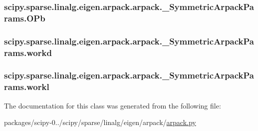 \subsubsection[{O\+Pb}]{\setlength{\rightskip}{0pt plus 5cm}scipy.\+sparse.\+linalg.\+eigen.\+arpack.\+arpack.\+\_\+\+Symmetric\+Arpack\+Params.\+O\+Pb}\label{classscipy_1_1sparse_1_1linalg_1_1eigen_1_1arpack_1_1arpack_1_1__SymmetricArpackParams_a47d02a66df63c498ea8040750c61daf0}
\hypertarget{classscipy_1_1sparse_1_1linalg_1_1eigen_1_1arpack_1_1arpack_1_1__SymmetricArpackParams_a29d44490cde9800363f511a399f6e00f}{}
\subsubsection[{workd}]{\setlength{\rightskip}{0pt plus 5cm}scipy.\+sparse.\+linalg.\+eigen.\+arpack.\+arpack.\+\_\+\+Symmetric\+Arpack\+Params.\+workd}\label{classscipy_1_1sparse_1_1linalg_1_1eigen_1_1arpack_1_1arpack_1_1__SymmetricArpackParams_a29d44490cde9800363f511a399f6e00f}
\hypertarget{classscipy_1_1sparse_1_1linalg_1_1eigen_1_1arpack_1_1arpack_1_1__SymmetricArpackParams_add676a07c109aaa21ed43b0e59a62830}{}
\subsubsection[{workl}]{\setlength{\rightskip}{0pt plus 5cm}scipy.\+sparse.\+linalg.\+eigen.\+arpack.\+arpack.\+\_\+\+Symmetric\+Arpack\+Params.\+workl}\label{classscipy_1_1sparse_1_1linalg_1_1eigen_1_1arpack_1_1arpack_1_1__SymmetricArpackParams_add676a07c109aaa21ed43b0e59a62830}


The documentation for this class was generated from the following file\+:\begin{DoxyCompactItemize}
\item 
packages/scipy-\/0../scipy/sparse/linalg/eigen/arpack/\hyperlink{arpack_8py}{arpack.\+py}\end{DoxyCompactItemize}

